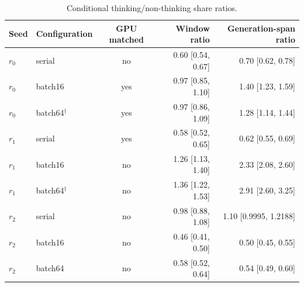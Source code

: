 
\begin{table}[t]
\caption{Conditional thinking/non-thinking share ratios.}
\label{tab:bootstrap-h2}
\centering\small
\begin{tabular}{llcrr}
\toprule
Seed & Configuration & GPU matched & Window ratio & Generation-span ratio \\
\midrule
$r_0$ & serial & no & 0.60 [0.54, 0.67] & 0.70 [0.62, 0.78] \\
$r_0$ & batch16 & yes & 0.97 [0.85, 1.10] & 1.40 [1.23, 1.59] \\
$r_0$ & batch64$^\dagger$ & yes & 0.97 [0.86, 1.09] & 1.28 [1.14, 1.44] \\
$r_1$ & serial & yes & 0.58 [0.52, 0.65] & 0.62 [0.55, 0.69] \\
$r_1$ & batch16 & no & 1.26 [1.13, 1.40] & 2.33 [2.08, 2.60] \\
$r_1$ & batch64$^\dagger$ & no & 1.36 [1.22, 1.53] & 2.91 [2.60, 3.25] \\
$r_2$ & serial & no & 0.98 [0.88, 1.08] & 1.10 [0.9995, 1.2188] \\
$r_2$ & batch16 & no & 0.46 [0.41, 0.50] & 0.50 [0.45, 0.55] \\
$r_2$ & batch64 & no & 0.58 [0.52, 0.64] & 0.54 [0.49, 0.60] \\
\bottomrule
\end{tabular}
\end{table}
